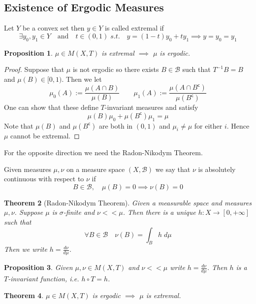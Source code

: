 \documentclass[11pt]{article}
\newcommand{\defeq}{:=}
\newcommand{\stcmp}{^{\mathsf{c}}}
\newenvironment{defin}
	{\begin{mdframed}[backgroundcolor=white, roundcorner=5pt, linewidth=1pt]}
	{\end{mdframed}}
\newcommand{\mdf}[1]{{\color{red} #1}}
\newtheorem{prop}{Proposition}[section]
\newtheorem{theorem}[prop]{Theorem}
\begin{document}
\subsection{Existence of Ergodic Measures}
\begin{defin}
 Let $Y$ be a convex set then $y\in Y$ is called \mdf{extremal} if
 \[
 \exists y_0, y_1 \in Y \quad \text{and} \quad t\in (0, 1)\; s.t. \quad y = (1-t)y_0 + ty_1 \implies y=y_0=y_1
 \]
\end{defin}

\begin{prop}
$\mu\in M(X, T)$ is extremal $\implies$ $\mu$ is ergodic.
\end{prop}

\begin{proof}
Suppose that $\mu$ is not ergodic so there exists $B\in\mathcal{B}$ such that $T^{-1}B = B$ and $\mu(B)\in [0, 1)$.
Then we let
\[
\mu_0(A)\defeq\frac{\mu(A\cap B)}{\mu(B)} \quad \quad \mu_1(A)\defeq\frac{\mu(A\cap B\stcmp)}{\mu(B\stcmp)}
\]
One can show that these define $T$-invariant measures and satisfy
\[
	\mu(B)\mu_0 + \mu(B\stcmp)\mu_1 = \mu
\]
Note that $\mu(B)$ and $\mu(B\stcmp)$ are both in $(0, 1)$ and $\mu_i\neq \mu$ for either $i$.
Hence $\mu$ cannot be extremal.
\end{proof}

For the opposite direction we need the Radon-Nikodym Theorem.

\begin{defin}
	Given measures $\mu, \nu$ on a measure space $(X, \mathcal{B})$	we say that $\nu$ is \mdf{absolutely continuous} with respect to $\nu$ if
	\[
		B\in\mathcal{B}, \quad \mu(B) = 0 \implies \nu(B) = 0
	\]
\end{defin}

\begin{theorem}[Radon-Nikodym Theorem]
Given a measurable space and measures $\mu, \nu$.
Suppose $\mu$ is $\sigma$-finite and $\nu << \mu$.
Then there is a unique $h:X\to [0, +\infty]$ such that
\[
	\forall B\in \mathcal{B} \quad \nu(B) = \int_B h \; d\mu
\]
Then we write $h=\frac{d\nu}{d\mu}$.
\end{theorem}

\begin{prop}
Given $\mu, \nu\in M(X, T)$ and $\nu << \mu$ write $h=\frac{d\nu}{d\mu}$.
Then $h$ is a $T$-invariant function, i.e. $h \circ T = h$.
\end{prop}

\begin{theorem}
$\mu \in M(X, T)$ is ergodic $\implies$ $\mu$ is extremal.
\end{theorem}
\end{document}
